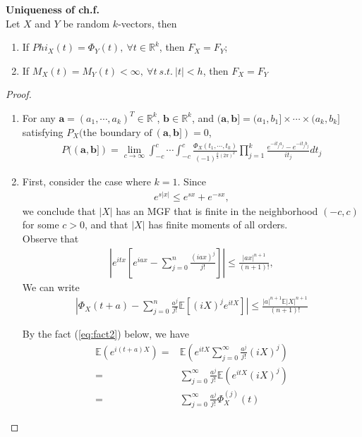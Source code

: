 \begin{theorem}
    \textbf{Uniqueness of ch.f.}\\
    Let $X$ and $Y$ be random $k$-vectors, then
    \begin{enumerate}
        \item If $Phi_X(t)=\Phi_Y(t),~\forall{t}\in\mathbb{R}^k$, then $F_X=F_Y$;
        \item If $M_X(t)=M_Y(t)<\infty,~\forall{t}~s.t.~|t|<h$, then $F_X=F_Y$
    \end{enumerate}
\end{theorem}
\begin{proof}
$~$\\
    \begin{enumerate}
        \item \label{prf:uniqchf1} For any $\boldsymbol{a}=(a_1, \cdots, a_k)^T\in\mathbb{R}^k$, $\boldsymbol{b}\in\mathbb{R}^k$,
        and $(\boldsymbol{a},\boldsymbol{b}]=(a_1,b_1]\times\cdots\times(a_k,b_k]$
        satisfying $P_X(\text{the boundary of}~(\boldsymbol{a},\boldsymbol{b}])=0$,
        \begin{gather}
            P((\boldsymbol{a},\boldsymbol{b}])
            =\lim_{c\to\infty}\int_{-c}^c\cdots\int_{-c}^c{
            \frac{\Phi_X(t_1,\cdots,t_k)}{(-1)^{\frac{k}{2}(2\pi)^k}}
            }\prod_{j=1}^k\frac{e^{-it_ja_j}-e^{-it_jb_j}}{it_j}dt_j
        \end{gather}
        \item \label{prf:uniqchf2} First, consider the case where $k=1$. Since
        \begin{gather}
            e^{s|x|}\leq e^{sx}+e^{-sx},
        \end{gather}
        we conclude that $|X|$ has an MGF that is finite in the neighborhood $(-c,c)$ for some $c>0$,
        and that $|X|$ has finite moments of all orders.\\
        Observe that 
        \begin{gather}
            \left| e^{itx}\left[ e^{iax}-\sum_{j=0}^n\frac{(iax)^j}{j!} \right] \right| \leq \frac{|ax|^{n+1}}{(n+1)!},
        \end{gather}
        We can write
        \begin{gather}
            \left| \Phi_X(t+a)-\sum_{j=0}^n\frac{a^j}{j!}\mathbb{E}[(iX)^je^{itX}] \right| \leq \frac{|a|^{n+1}\mathbb{E}|X|^{n+1}}{(n+1)!}
        \end{gather}
        
        By the fact (\ref{eq:fact2}) below, we have
        \begin{align}
            \mathbb{E}(e^{i(t+a)X})
            =& \mathbb{E}\left( e^{itX}\sum_{j=0}^\infty\frac{a^j}{j!}(iX)^j \right)\\
            =& \sum_{j=0}^\infty\frac{a^j}{j!}\mathbb{E}\left( e^{itX}(iX)^j \right)\\
            =& \sum_{j=0}^\infty\frac{a^j}{j!}\Phi^{(j)}_X(t)
        \end{align}
        

\end{enumerate}
\end{proof}
